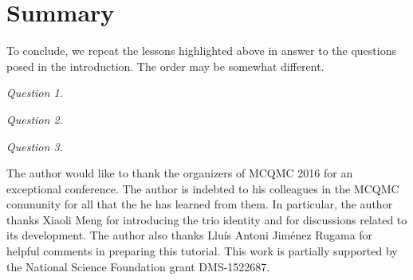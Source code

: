 \documentclass[graybox,footinfo]{svmult}
\begin{document}
\begin{FJHLesson}
	\FJHLessonEleven
\end{FJHLesson}


\section{Summary}
To conclude, we repeat the lessons highlighted above in answer to the questions posed 
in the 
introduction.  The order may be somewhat different.

\FJHLessonZero \FJHLessonSix  \FJHLessonTwoHalf \FJHLessonFourteen \FJHLessonSeven 
\FJHLessonNine



\begin{list}{}{\setlength\leftmargin{4.2ex}\setlength{}}
	\item[\emph{Question 1.}] \emph{\FJHQOne}
	
	\FJHLessonOne \FJHLessonTwo \FJHLessonThree   \FJHLessonFive
	
	\item[\emph{Question 2.}] \emph{\FJHQTwo}
	
	\FJHLessonFour 	\FJHLessonEight \FJHLessonTwelve 	\FJHLessonThirteen
	
	\item[\emph{Question 3.}] \emph{\FJHQThree}
	
	\FJHLessonTen \FJHLessonEleven
	
	
\end{list}

\begin{acknowledgement}
	The author would like to thank the organizers of MCQMC 2016 for an exceptional 
	conference.  The author is indebted to his colleagues in the MCQMC 
	community for all that the he has learned from them.  In particular, the author thanks 
 Xiaoli Meng for introducing the trio identity and for 
 discussions related to its development.  The author also thanks Llu\'is Antoni 
	Jim\'enez Rugama for helpful comments in preparing this tutorial.  This work is partially 
	supported by the National Science Foundation grant DMS-1522687.
\end{acknowledgement}




\end{document}
